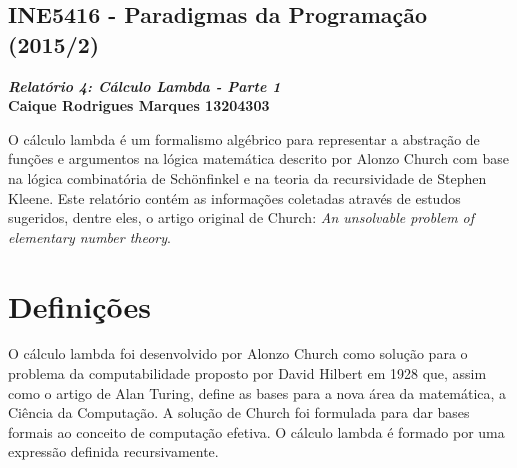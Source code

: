 \documentclass{article}
\begin{document}
\lstset{language=Python}
\begin{center}
    \section*{INE5416 - Paradigmas da Programação (2015/2)}
    \textbf{\textit{Relatório 4: Cálculo Lambda - Parte 1} \\
    Caique Rodrigues Marques 13204303}
\end{center}
O cálculo lambda é um formalismo algébrico para representar a abstração de funções e argumentos na lógica matemática descrito por Alonzo Church com base na lógica combinatória de Schönfinkel e na teoria da recursividade de Stephen Kleene. Este relatório contém as informações coletadas através de estudos sugeridos, dentre eles, o artigo original de Church: \textit{An unsolvable problem of elementary number theory}.

\section*{Definições}
O cálculo lambda foi desenvolvido por Alonzo Church como solução para o problema da computabilidade proposto por David Hilbert em 1928 que, assim como o artigo de Alan Turing, define as bases para a nova área da matemática, a Ciência da Computação. A solução de Church foi formulada para dar bases formais ao conceito de computação efetiva. O cálculo lambda é formado por uma expressão definida recursivamente.
\end{document}
